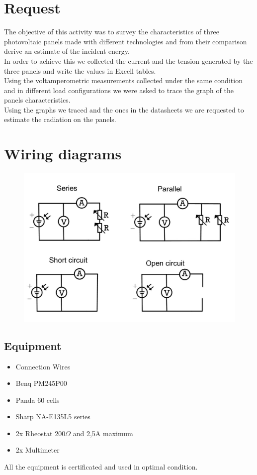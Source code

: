 \documentclass[12pt]{article}
\begin{document}
\section{Request}
The objective of this activity was to survey the characteristics of three photovoltaic panels made with different
technologies and from their comparison derive an estimate of the incident energy.\\
In order to achieve this we collected the current and the tension generated by the three panels and write
the values in Excell tables.\\
Using the voltamperometric measurements collected under the same condition and in different load configurations we were asked to trace the graph of the
panels characteristics.\\
Using the graphs we traced and the ones in the datasheets we are requested to estimate the radiation on the
panels.\\
\section{Wiring diagrams}
\begin{figure}[ht]
	\centering
	\includegraphics[scale=0.2]{schema.jpg}
\end{figure}
\newpage
\subsection{Equipment}
\begin{itemize}
	\item Connection Wires
	\item Benq PM245P00
	\item Panda 60 cells
	\item Sharp NA-E135L5 series
	\item 2x Rheostat  $200\Omega$ and 2,5A maximum
	\item 2x Multimeter
\end{itemize}
All the equipment is certificated and used in optimal condition.\\
\end{document}
